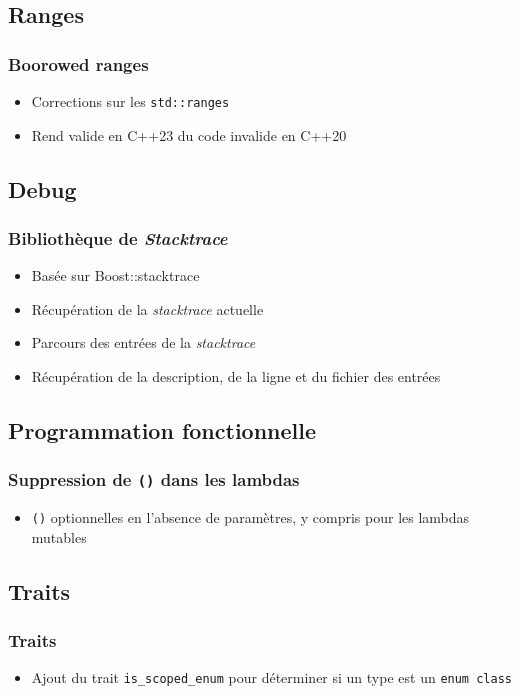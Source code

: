 \documentclass[C++.tex]{subfiles}
\begin{document}
\subsection*{Ranges}
\begin{frame}[fragile]
	\frametitle{Boorowed ranges}
	\begin{itemize}
		\item Corrections sur les \lstinline|std::ranges|
		\item Rend valide en C++23 du code invalide en C++20
	\end{itemize}
\end{frame}

\subsection*{Debug}
\begin{frame}[fragile]
	\frametitle{Bibliothèque de \textit{Stacktrace}}
	\begin{itemize}
		\item Basée sur Boost::stacktrace
		\item Récupération de la \textit{stacktrace} actuelle
		\item Parcours des entrées de la \textit{stacktrace}
		\item Récupération de la description, de la ligne et du fichier des entrées
	\end{itemize}
\end{frame}

\subsection*{Programmation fonctionnelle}
\begin{frame}[fragile]
	\frametitle{Suppression de \lstinline|()| dans les lambdas}
		\begin{itemize}
			\item \lstinline|()| optionnelles en l'absence de paramètres, y compris pour les lambdas mutables


		\end{itemize}
\end{frame}

\subsection*{Traits}
\begin{frame}[fragile]
	\frametitle{Traits}
	\begin{itemize}
		\item Ajout du trait \lstinline|is_scoped_enum| pour déterminer si un type est un \lstinline|enum class|
	\end{itemize}
\end{frame}
\end{document}
